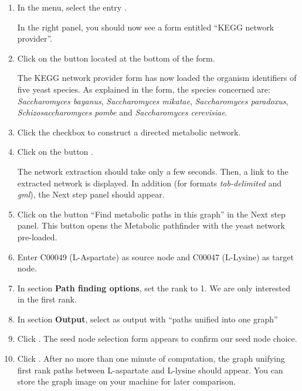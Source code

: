 \begin{enumerate}

\item In the \neat menu, select the entry .

  In the right panel, you should now see a form entitled
  ``KEGG network provider''.

\item Click on the button  located at the bottom of the form.

  The KEGG network provider form has now loaded the organism identifiers of five yeast species. As explained
  in the form, the species concerned are: \textit{Saccharomyces bayanus}, \textit{Saccharomyces mikatae},
  \textit{Saccharomyces paradoxus}, \textit{Schizosaccharomyces pombe} and \textit{Saccharomyces cerevisiae}.

\item Click the checkbox  to construct a directed metabolic network.

\item Click on the button .

  The network extraction should take only a few seconds.
  Then, a link to the extracted network is displayed.
  In addition (for formats \textit{tab-delimited} and \textit{gml}), the Next step panel should appear.

\item Click on the button ``Find metabolic paths in this graph'' in the Next step panel. This button opens the
Metabolic pathfinder with the yeast network pre-loaded.

\item Enter C00049 (L-Aspartate) as source node and C00047 (L-Lysine) as target node.

\item In section \textbf{Path finding options}, set the rank to 1. We are only interested in the first rank.

\item In section \textbf{Output}, select  as output with ``paths unified into one graph''

\item Click .
  The seed node selection form appears to confirm our seed node choice.

\item Click .
	After no more than one minute of computation, the graph unifying first rank paths between L-aspartate and L-lysine should appear.
	You can store the graph image on your machine for later comparison.

\end{enumerate}

